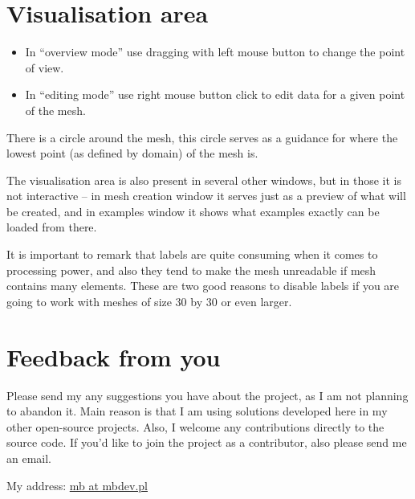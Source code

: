 \documentclass[a4paper,12pt]{article}
\begin{document}
\newpage

\section{Visualisation area}

\begin{itemize}

  \item In ``overview mode'' use dragging with left mouse button to change the point of view.

  \item In ``editing mode'' use right mouse button click to edit data for a given point of the mesh.

\end{itemize}

There is a circle around the mesh, this circle serves as a guidance for where the lowest point (as defined by domain) of
the mesh is.

The visualisation area is also present in several other windows, but in those it is not interactive -- in mesh creation
window it serves just as a preview of what will be created, and in examples window it shows what examples exactly can be
loaded from there.

It is important to remark that labels are quite consuming when it comes to processing power, and also they tend to make
the mesh unreadable if mesh contains many elements. These are two good reasons to disable labels if you are going to
work with meshes of size 30 by 30 or even larger.

\section{Feedback from you}

Please send my any suggestions you have about the project, as I am not planning to abandon it. Main reason is that I am
using solutions developed here in my other open-source projects. Also, I welcome any contributions directly to the source
code. If you'd like to join the project as a contributor, also please send me an email. 

My address: \href{mailto:mb at mbdev.pl}{mb at mbdev.pl}  
\end{document}
